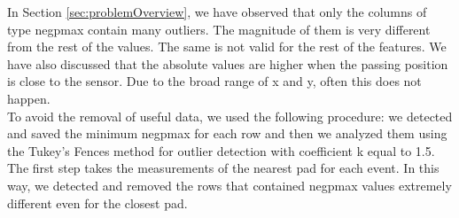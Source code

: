 \documentclass[conference]{IEEEtran}
\begin{document}
In Section \ref{sec:problemOverview}, we have observed that only the columns of type negpmax contain many outliers. The magnitude of them is very different from the rest of the values. The same is not valid for the rest of the features.
We have also discussed that the absolute values are higher when the passing position is close to the sensor. Due to the broad range of x and y, often this does not happen. \\ 
To avoid the removal of useful data, we used the following procedure: we detected and saved the minimum negpmax for each row and then we analyzed them using the Tukey's Fences method for outlier detection with coefficient k equal to 1.5. \\
The first step takes the measurements of the nearest pad for each event. In this way, we detected and removed the rows that contained negpmax values extremely different even for the closest pad.
 
\end{document}
